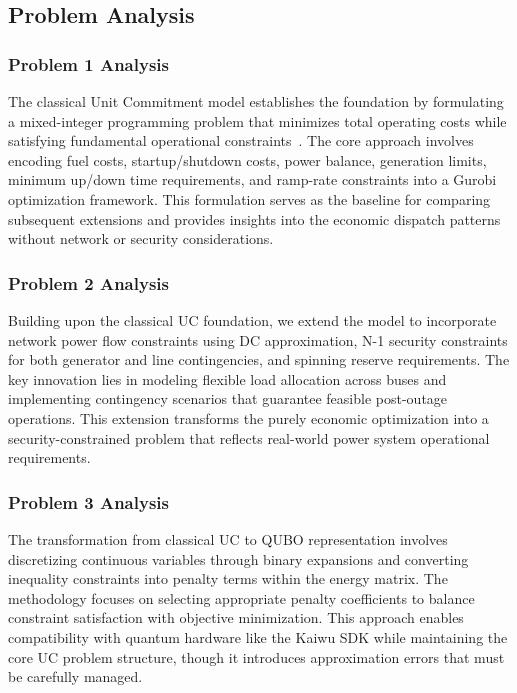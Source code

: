 \documentclass{apmcmthesis}
\begin{document}
\subsection{Problem Analysis}

\subsubsection{Problem 1 Analysis}
The classical Unit Commitment model establishes the foundation by formulating a mixed-integer programming problem that minimizes total operating costs while satisfying fundamental operational constraints~\cite{carrion2006}. The core approach involves encoding fuel costs, startup/shutdown costs, power balance, generation limits, minimum up/down time requirements, and ramp-rate constraints into a Gurobi optimization framework. This formulation serves as the baseline for comparing subsequent extensions and provides insights into the economic dispatch patterns without network or security considerations.

\subsubsection{Problem 2 Analysis}
Building upon the classical UC foundation, we extend the model to incorporate network power flow constraints using DC approximation, N-1 security constraints for both generator and line contingencies, and spinning reserve requirements. The key innovation lies in modeling flexible load allocation across buses and implementing contingency scenarios that guarantee feasible post-outage operations. This extension transforms the purely economic optimization into a security-constrained problem that reflects real-world power system operational requirements.

\subsubsection{Problem 3 Analysis}
The transformation from classical UC to QUBO representation involves discretizing continuous variables through binary expansions and converting inequality constraints into penalty terms within the energy matrix. The methodology focuses on selecting appropriate penalty coefficients to balance constraint satisfaction with objective minimization. This approach enables compatibility with quantum hardware like the Kaiwu SDK while maintaining the core UC problem structure, though it introduces approximation errors that must be carefully managed.
\end{document}
